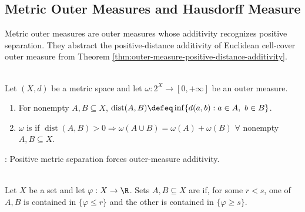 \subsection{Metric Outer Measures and Hausdorff Measure}

Metric outer measures are outer measures whose additivity recognizes positive separation. They abstract the positive-distance additivity of Euclidean cell-cover outer measure from Theorem \ref{thm:outer-measure-positive-distance-additivity}.

\begin{definition} \label{def:metric-caratheodory-outer-measure} \\
Let $(X,d)$ be a metric space and let $\omega:2^X\to[0,+\infty]$ be an outer measure.
\begin{enumerate}[label=(\roman*)]
\setlength{\itemsep}{0pt}
\item For nonempty $A,B\subseteq X$, $\operatorname{dist}(A,B)\defeq\inf\{d(a,b):a\in A,\ b\in B\}$.
\item $\omega$ is  if $\operatorname{dist}(A,B)>0\Rightarrow\omega(A\cup B)=\omega(A)+\omega(B)$ $\forall$ nonempty $A,B\subseteq X$.
\end{enumerate}
: Positive metric separation forces outer-measure additivity.
\end{definition}

\begin{definition} \label{def:real-function-separated-sets} \\
Let $X$ be a set and let $\varphi:X\to\R$. Sets $A,B\subseteq X$ are  if, for some $r<s$, one of $A,B$ is contained in $\{\varphi\leq r\}$ and the other is contained in $\{\varphi\geq s\}$.
\end{definition}

